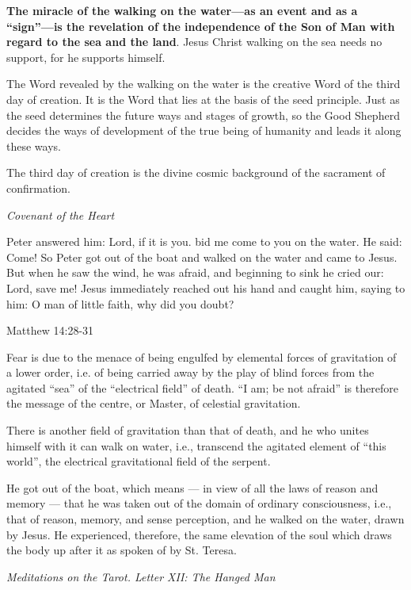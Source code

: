 \textbf{The miracle of the walking on the water—as an event and as a “sign”—is
the revelation of the independence of the Son of Man with regard to the sea and the land}. Jesus Christ walking on the
sea needs no support, for he supports himself.

The Word revealed by the walking on the water is the creative Word of the third day of creation. It is the Word that
lies at the basis of the seed principle. Just as the seed determines the future ways and stages of growth, so the Good
Shepherd decides the ways of development of the true being of humanity and leads it along these ways.

\begin{quotationx}
The third day of creation is the divine cosmic background of the sacrament of confirmation. \begin{flushright} \emph{Covenant of the
Heart}\end{flushright}

\end{quotationx}
Peter answered him: Lord, if it is you. bid me come to you on the water. He said: Come! So Peter got out of the boat and
walked on the water and came to Jesus. But when he saw the wind, he was afraid, and beginning to sink he cried our:
Lord, save me! Jesus immediately reached out his hand and caught him, saying to him: O man of little faith, why did you
doubt? \begin{flushright} Matthew 14:28-31\end{flushright}

Fear is due to the menace of being engulfed by elemental forces of gravitation of a lower order, i.e. of being carried
away by the play of blind forces from the agitated “sea” of the “electrical field” of death. “I am; be not afraid” is
therefore the message of the centre, or Master, of celestial gravitation.

There is another field of gravitation than that of death, and he who unites himself with it can walk on water, i.e.,
transcend the agitated element of “this world”, the electrical gravitational field of the serpent.

\begin{quotationx}
He got out of the boat, which means — in view of all the laws of reason and memory
— that he was taken out of the domain of ordinary consciousness, i.e., that of reason, memory, and
sense perception, and he walked on the water, drawn by Jesus. He experienced, therefore, the same elevation of the soul
which draws the body up after it as spoken of by St. Teresa. \begin{flushright} \emph{Meditations on the Tarot. Letter XII: The
Hanged Man}\end{flushright}

\end{quotationx}
